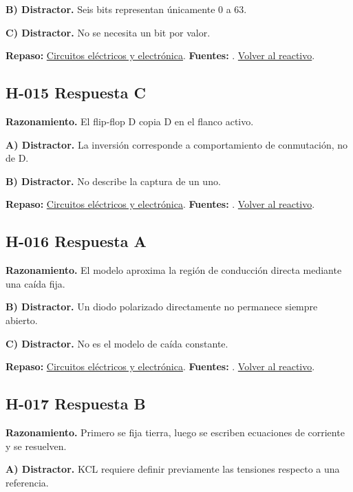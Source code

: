 \textbf{B) Distractor. }Seis bits representan únicamente 0 a 63.

\textbf{C) Distractor. }No se necesita un bit por valor.

\textbf{Repaso:} \hyperref[sec:h1]{Circuitos eléctricos y electrónica}. \textbf{Fuentes:} \cite{openstax,electronics,digital}. \hyperref[q:H-014]{Volver al reactivo}.\par\medskip

\subsection*{H-015 \quad Respuesta C}\label{s:H-015}
\textbf{Razonamiento.} El flip-flop D copia D en el flanco activo.

\textbf{A) Distractor. }La inversión corresponde a comportamiento de conmutación, no de D.

\textbf{B) Distractor. }No describe la captura de un uno.

\textbf{Repaso:} \hyperref[sec:h1]{Circuitos eléctricos y electrónica}. \textbf{Fuentes:} \cite{openstax,electronics,digital}. \hyperref[q:H-015]{Volver al reactivo}.\par\medskip

\subsection*{H-016 \quad Respuesta A}\label{s:H-016}
\textbf{Razonamiento.} El modelo aproxima la región de conducción directa mediante una caída fija.

\textbf{B) Distractor. }Un diodo polarizado directamente no permanece siempre abierto.

\textbf{C) Distractor. }No es el modelo de caída constante.

\textbf{Repaso:} \hyperref[sec:h1]{Circuitos eléctricos y electrónica}. \textbf{Fuentes:} \cite{openstax,electronics,digital}. \hyperref[q:H-016]{Volver al reactivo}.\par\medskip

\subsection*{H-017 \quad Respuesta B}\label{s:H-017}
\textbf{Razonamiento.} Primero se fija tierra, luego se escriben ecuaciones de corriente y se resuelven.

\textbf{A) Distractor. }KCL requiere definir previamente las tensiones respecto a una referencia.

